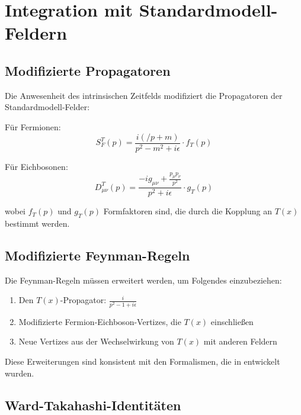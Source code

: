 \documentclass[12pt,a4paper]{article}
\newcommand{\Tfield}{T(x)}
\begin{document}
	\section{Integration mit Standardmodell-Feldern}
	\label{sec:integration_standardmodell}
	
	\subsection{Modifizierte Propagatoren}
	\label{sec:modifizierte_propagatoren}
	
	Die Anwesenheit des intrinsischen Zeitfelds modifiziert die Propagatoren der Standardmodell-Felder:
	
	Für Fermionen:
	\begin{equation}
		S_F^T(p) = \frac{i(\slash{p} + m)}{p^2 - m^2 + i\epsilon} \cdot f_T(p)
	\end{equation}
	
	Für Eichbosonen:
	\begin{equation}
		D_{\mu\nu}^T(p) = \frac{-ig_{\mu\nu} + \frac{p_{\mu}p_{\nu}}{p^2}}{p^2 + i\epsilon} \cdot g_T(p)
	\end{equation}
	
	wobei $f_T(p)$ und $g_T(p)$ Formfaktoren sind, die durch die Kopplung an $\Tfield$ bestimmt werden.
	
	\subsection{Modifizierte Feynman-Regeln}
	\label{sec:feynman_regeln}
	
	Die Feynman-Regeln müssen erweitert werden, um Folgendes einzubeziehen:
	
	\begin{enumerate}
		\item Den $\Tfield$-Propagator: $\frac{i}{p^2 - 1 + i\epsilon}$
		\item Modifizierte Fermion-Eichboson-Vertizes, die $\Tfield$ einschließen
		\item Neue Vertizes aus der Wechselwirkung von $\Tfield$ mit anderen Feldern
	\end{enumerate}
	
	Diese Erweiterungen sind konsistent mit den Formalismen, die in \cite{pascher_formalismen_2025} entwickelt wurden.
	
	\subsection{Ward-Takahashi-Identitäten}
	\label{sec:ward_identitaeten}
	
\end{document}
